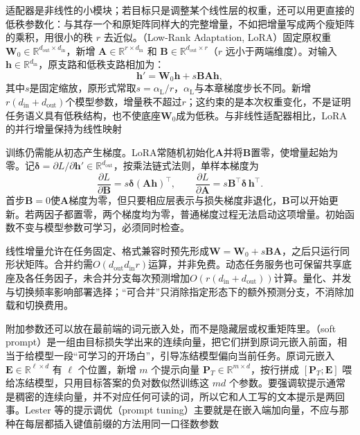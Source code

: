适配器是非线性的小模块；若目标只是调整某个线性层的权重，还可以用更直接的低秩参数化：与其存一个和原矩阵同样大的完整增量，不如把增量写成两个瘦矩阵的乘积，用很小的秩 $r$ 去近似。（Low-Rank Adaptation, LoRA）固定原权重 $\bm W_0\in\mathbb R^{d_{\mathrm{out}}\times d_{\mathrm{in}}}$，新增 $\bm A\in\mathbb R^{r\times d_{\mathrm{in}}}$ 和 $\bm B\in\mathbb R^{d_{\mathrm{out}}\times r}$（$r$ 远小于两端维度）。对输入 $\bm h\in\mathbb R^{d_{\mathrm{in}}}$，原支路和低秩支路相加为：
\begin{equation}
  \bm h'=\bm W_0\bm h+s\bm B\bm A\bm h,
  \label{eq:ket-transfer-lora}
\end{equation}
其中$s$是固定缩放，原形式常取$s=\alpha_{\mathrm L}/r$，$\alpha_{\mathrm L}$与本章梯度步长不同。新增$r(d_{\mathrm{in}}+d_{\mathrm{out}})$个模型参数，增量秩不超过$r$；这约束的是本次权重变化，不是证明任务语义具有低秩结构，也不使底座$\bm W_0$成为低秩。与非线性适配器相比，LoRA的并行增量保持为线性映射

训练仍需能从初态产生梯度。LoRA常随机初始化$\bm A$并将$\bm B$置零，使增量起始为零。记$\bm\delta=\partial L/\partial\bm h'\in\mathbb R^{d_{\mathrm{out}}}$，按乘法链式法则，单样本梯度为
\[
  \frac{\partial L}{\partial\bm B}
       =s\bm\delta(\bm A\bm h)^\top,\qquad
  \frac{\partial L}{\partial\bm A}
       =s\bm B^\top\bm\delta\,\bm h^\top.
\]
首步$\bm B=0$使$\bm A$梯度为零，但只要相应层表示与损失梯度非退化，$\bm B$可以开始更新。若两因子都置零，两个梯度均为零，普通梯度过程无法启动这项增量。初始函数不变与模型参数可学习，必须同时检查。

线性增量允许在任务固定、格式兼容时预先形成$\bm W=\bm W_0+s\bm B\bm A$，之后只运行同形状矩阵。合并约需$O(d_{\mathrm{out}}d_{\mathrm{in}}r)$运算，并非免费。动态任务服务也可保留共享底座及各任务因子，未合并分支每次预测增加$O(r(d_{\mathrm{in}}+d_{\mathrm{out}}))$计算。量化、并发与切换频率影响部署选择；“可合并”只消除指定形态下的额外预测分支，不消除加载和切换费用。

附加参数还可以放在最前端的词元嵌入处，而不是隐藏层或权重矩阵里。（soft prompt）是一组由目标损失学出来的连续向量，把它们拼到原词元嵌入前面，相当于给模型一段“可学习的开场白”，引导冻结模型偏向当前任务。原词元嵌入 $\bm E\in\mathbb R^{\ell\times d}$ 有 $\ell$ 个位置，新增 $m$ 个提示向量 $\bm P_T\in\mathbb R^{m\times d}$，按行拼成 $[\bm P_T;\bm E]$ 喂给冻结模型，只用目标答案的负对数似然训练这 $md$ 个参数。要强调软提示通常是稠密的连续向量，并不对应任何可读的词，所以它和人工写的文本提示是两回事。Lester 等的提示调优（prompt tuning）主要就是在嵌入端加向量，不应与那种在每层都插入键值前缀的方法用同一口径数参数

